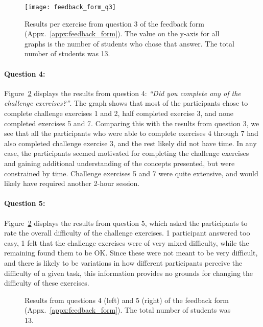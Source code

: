 \begin{figure}[htp]
	\centering
	\texttt{[image: feedback\_form\_q3]}
	\caption[Results from feedback form question 3]{Results per exercise from question 3 of the feedback form (Appx.~\ref{appx:feedback_form}). The value on the y-axis for all graphs is the number of students who chose that answer. The total number of students was 13.}
	\label{fig:feedback_form_q3}
\end{figure}

\paragraph{Question 4:} Figure~\ref{fig:feedback_form_q45} displays the results from question 4: \emph{``Did you complete any of the challenge exercises?''}. The graph shows that most of the participants chose to complete challenge exercises 1 and 2, half completed exercise 3, and none completed exercises 5 and 7. Comparing this with the results from question 3, we see that all the participants who were able to complete exercises 4 through 7 had also completed challenge exercise 3, and the rest likely did not have time. In any case, the participants seemed motivated for completing the challenge exercises and gaining additional understanding of the concepts presented, but were constrained by time. Challenge exercises 5 and 7 were quite extensive, and would likely have required another 2-hour session.

\paragraph{Question 5:} Figure~\ref{fig:feedback_form_q45} displays the results from question 5, which asked the participants to rate the overall difficulty of the challenge exercises. 1 participant answered too easy, 1 felt that the challenge exercises were of very mixed difficulty, while the remaining found them to be OK. Since these were not meant to be very difficult, and there is likely to be variations in how different participants perceive the difficulty of a given task, this information provides no grounds for changing the difficulty of these exercises.

\begin{figure}[htp]
	\caption[Results from feedback form questions 4 and 5]{Results from questions 4 (left) and 5 (right) of the feedback form (Appx.~\ref{appx:feedback_form}). The total number of students was 13.}
	\label{fig:feedback_form_q45}
\end{figure}

